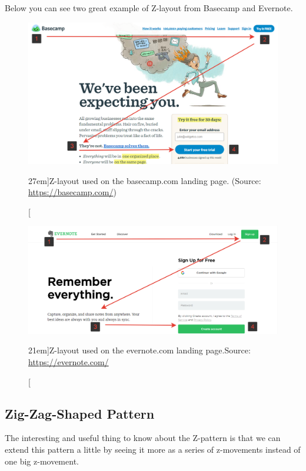 Below you can see two great example of Z-layout from Basecamp and Evernote.
\begin{figure}%
	\centering
  \includegraphics[width=1.5\textwidth]{../figures/z-shape_basecamp.png}
  \caption[][27em]{Z-layout used on the basecamp.com landing page. (Source: \url{https://basecamp.com/})}
  \label{fig:z-shape_facebook}
\end{figure}

\begin{figure}%
	\centering
  \includegraphics[width=1.5\textwidth]{../figures/z-shape_evernote.png}
  \caption[][21em]{Z-layout used on the evernote.com landing page.\newline Source: \url{https://evernote.com/}}
  \label{fig:z-shape_facebook}
\end{figure}

\subsection{Zig-Zag-Shaped Pattern} %
\label{sub:zig_zag_shaped_pattern}

The interesting and useful thing to know about the Z-pattern is that we can extend this pattern a little by seeing it more as a series of z-movements instead of one big z-movement.


